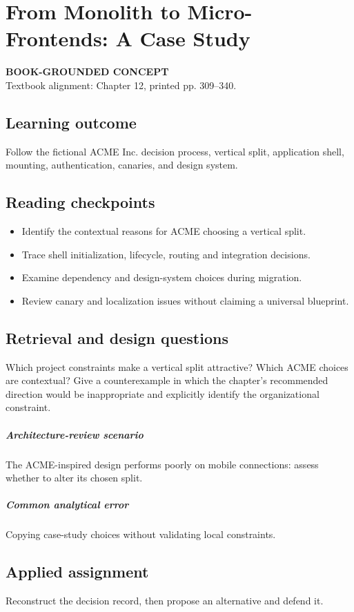 \documentclass[11pt,letterpaper,oneside]{report}
\newcommand{\based}[1]{\begin{sourcebox}\textbf{BOOK-GROUNDED CONCEPT}\\#1\end{sourcebox}}
\begin{document}
\chapter{From Monolith to Micro-Frontends: A Case Study}
\based{Textbook alignment: Chapter 12, printed pp. 309--340.}
\section{Learning outcome}
Follow the fictional ACME Inc. decision process, vertical split, application shell, mounting, authentication, canaries, and design system.
\section{Reading checkpoints}
\begin{itemize}\item Identify the contextual reasons for ACME choosing a vertical split.
\item Trace shell initialization, lifecycle, routing and integration decisions.
\item Examine dependency and design-system choices during migration.
\item Review canary and localization issues without claiming a universal blueprint.
\end{itemize}
\section{Retrieval and design questions}
Which project constraints make a vertical split attractive? Which ACME choices are contextual? Give a counterexample in which the chapter's recommended direction would be inappropriate and explicitly identify the organizational constraint.
\paragraph{Architecture-review scenario} The ACME-inspired design performs poorly on mobile connections: assess whether to alter its chosen split.
\paragraph{Common analytical error} Copying case-study choices without validating local constraints.
\section{Applied assignment}
Reconstruct the decision record, then propose an alternative and defend it.
\end{document}

